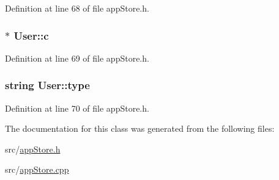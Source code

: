 Definition at line 68 of file app\-Store.\-h.

\hypertarget{class_user_a98dcb22d99f74e7be130ebfa7ea4ffc1}{
\subsubsection[{c}]{$\ast$ User\-::c}}\label{class_user_a98dcb22d99f74e7be130ebfa7ea4ffc1}


Definition at line 69 of file app\-Store.\-h.

\hypertarget{class_user_a96c341b10272580def215fcdccfa0d5e}{
\subsubsection[{type}]{\setlength{\rightskip}{0pt plus 5cm}string User\-::type}}\label{class_user_a96c341b10272580def215fcdccfa0d5e}


Definition at line 70 of file app\-Store.\-h.



The documentation for this class was generated from the following files\-:\begin{DoxyCompactItemize}
\item 
src/\hyperlink{app_store_8h}{app\-Store.\-h}\item 
src/\hyperlink{app_store_8cpp}{app\-Store.\-cpp}\end{DoxyCompactItemize}
